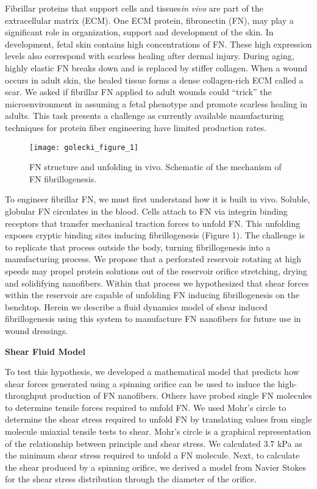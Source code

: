 Fibrillar proteins that support cells and tissues\textit{in vivo} are part of the extracellular matrix
(ECM). One ECM protein, fibronectin (FN), may play a significant role in organization, support
and development of the skin. In development, fetal skin contains high concentrations of FN.
These high expression levels also correspond with scarless healing after dermal injury. During
aging, highly elastic FN breaks down and is replaced by stiffer collagen. When a wound occurs
in adult skin, the healed tissue forms a dense collagen-rich ECM called a scar. We asked if
fibrillar FN applied to adult wounds could “trick” the microenvironment in assuming a fetal
phenotype and promote scarless healing in adults. This task presents a challenge as currently
available manufacturing techniques for protein fiber engineering have limited production rates.

\renewcommand{\thefigure}{1}
\begin{figure}[h]
  \begin{center}
    \texttt{[image: golecki\_figure\_1]}
  \end{center}
  \caption{FN structure and unfolding in vivo. Schematic of the mechanism of FN fibrillogenesis.}
\end{figure}

To engineer fibrillar FN, we must first understand how it is built in vivo. Soluble,
globular FN circulates in the blood. Cells attach to FN via integrin binding receptors that transfer
mechanical traction forces to unfold FN. This unfolding exposes cryptic binding sites inducing
fibrillogenesis (Figure 1). The challenge is to replicate that process outside the body, turning fibrillogenesis into a manufacturing process. We propose that a perforated reservoir rotating at
high speeds may propel protein solutions out of the reservoir orifice stretching, drying and
solidifying nanofibers. Within that process we hypothesized that shear forces within the reservoir
are capable of unfolding FN inducing fibrillogenesis on the benchtop. Herein we describe a fluid
dynamics model of shear induced fibrillogenesis using this system to manufacture FN nanofibers
for future use in wound dressings.

\noindent
\textbf{Shear Fluid Model}

To test this hypothesis, we developed a mathematical model that predicts how shear forces generated using a spinning orifice can be used to induce the high-throughput production of FN nanofibers. Others have probed single FN molecules to determine tensile forces required to unfold FN. We used Mohr’s circle \cite{gere} to determine the shear stress required to unfold FN by translating values from single molecule uniaxial tensile tests \cite{oberhauser} to shear. Mohr’s circle is a graphical representation of the relationship between principle and shear stress. We calculated 3.7 kPa as the minimum shear stress required to unfold a FN molecule. Next, to calculate the shear produced by a spinning orifice, we derived a model from Navier Stokes for the shear stress distribution through the diameter of the orifice.

